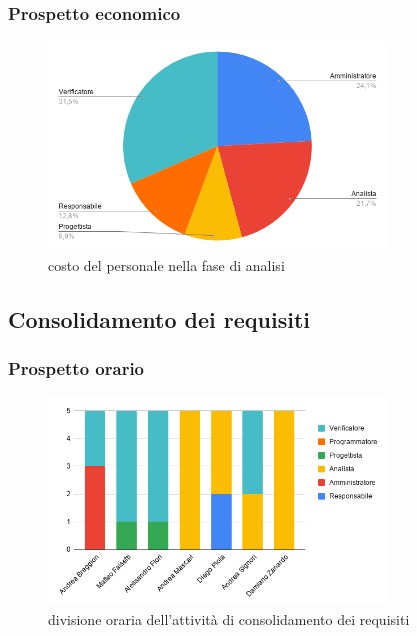     \subsubsection{Prospetto economico}
    \def\salarycontent{
        {Amministratore,49,20,980},
        {Analista,44,25,1100},
        {Progettista,20,22,440},
        {Programmatore,0,15,0},
        {Responsabile,26,30,780},
        {Verificatore,64,15,960},
        {Totale,203,127,4260},
    }
    
    \begin{figure}[H]
        \centering
        \includegraphics[width=0.8\textwidth]{source/img/analisi_ruoli.png}
        \caption{costo del personale nella fase di analisi}
    \end{figure}
\subsection{Consolidamento dei requisiti}
    \subsubsection{Prospetto orario}
    \def\hourlycontent{
        {Andrea Breggion,0,3,0,0,0,2,5},
        {Matteo Falsetti,0,0,0,1,0,4,5},
        {Alessandro Flori,0,0,0,1,0,4,5},
        {Andrea Mascari,0,0,5,0,0,0,5},
        {Diego Piola,2,0,3,0,0,0,5},
        {Andrea Signori,0,0,2,0,0,3,5},
        {Damiano Zanardo,0,0,5,0,0,0,5},
        {Ore totali,2,3,15,2,0,13,35},
    }
     
    \begin{figure}[H]
        \centering
        \includegraphics[width=0.8\textwidth]{source/img/consolidamento_orari.png}
        \caption{divisione oraria dell'attività di consolidamento dei requisiti}
    \end{figure}
